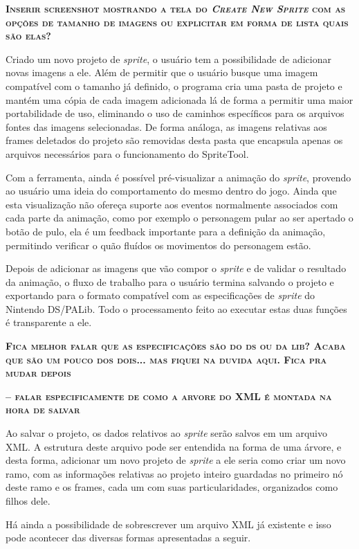 \documentclass[brazil]{abnt}
\begin{document}
\textsc{\textbf{Inserir screenshot mostrando a tela do \textit{Create New Sprite} com as opções de tamanho de imagens ou explicitar em forma de lista quais são elas?}}

Criado um novo projeto de \textit{sprite}, o usuário tem a possibilidade de adicionar novas imagens a ele. Além de permitir que o usuário busque uma imagem compatível com o tamanho já definido, o programa cria uma pasta de projeto e mantém uma cópia de cada imagem adicionada lá de forma a permitir uma maior portabilidade de uso, eliminando o uso de caminhos específicos para os arquivos fontes das imagens selecionadas. De forma análoga, as imagens relativas aos frames deletados do projeto são removidas desta pasta que encapsula apenas os arquivos necessários para o funcionamento do SpriteTool.

Com a ferramenta, ainda é possível pré-visualizar a animação do \textit{sprite}, provendo ao usuário uma ideia do comportamento do mesmo dentro do jogo. Ainda que esta  visualização não ofereça suporte aos eventos normalmente associados com cada parte da animação, como por exemplo o personagem pular ao ser apertado o botão de pulo, ela é um feedback importante para a definição da animação, permitindo verificar o quão fluídos os movimentos do personagem estão.

Depois de adicionar as imagens que vão compor o \textit{sprite} e de validar o resultado da animação, o fluxo de trabalho para o usuário termina salvando o projeto e exportando para o formato compatível com as especificações de \textit{sprite} do Nintendo DS/PALib. Todo o processamento feito ao executar estas duas funções é transparente a ele. 

\textsc{\textbf{Fica melhor falar que as especificações são do ds ou da lib? Acaba que são um pouco dos dois... mas fiquei na duvida aqui. Fica pra mudar depois}}

\textsc{\textbf{-- falar especificamente de como a arvore do XML é montada na hora de salvar}}

Ao salvar o projeto, os dados relativos ao \textit{sprite} serão salvos em um arquivo XML. A estrutura deste arquivo pode ser entendida na forma de uma árvore, e desta forma, adicionar um novo projeto de \textit{sprite} a ele seria como criar um novo ramo, com as informações relativas ao projeto inteiro guardadas no primeiro nó deste ramo e os frames, cada um com suas particularidades, organizados como filhos dele.

Há ainda a possibilidade de sobrescrever um arquivo XML já existente e isso pode acontecer das diversas formas apresentadas a seguir. 
\end{document}
